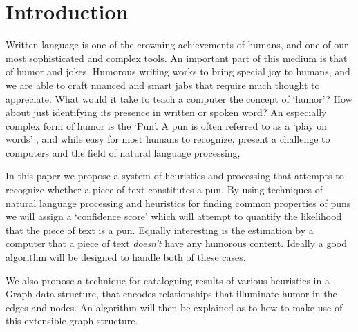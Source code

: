 \section{Introduction}

Written language is one of the crowning achievements of humans, and one of our most sophisticated and complex tools. An important part of this medium is that of humor and jokes. Humorous writing works to bring special joy to humans, and we are able to craft nuanced and smart jabs that require much thought to appreciate. What would it take to teach a computer the concept of `humor'? How about just identifying its presence in written or spoken word? An especially complex form of humor is the `Pun'.  A pun  is often referred to as a `play on words' , and while easy for most humans to recognize, present a challenge to computers and the field of natural language processing,

In this paper we propose a system of heuristics and processing that attempts to recognize whether a piece of text constitutes a pun. By using techniques of natural language processing and heuristics for finding common properties of puns we will assign a `confidence score' which will attempt to quantify the likelihood that the piece of text is a pun. Equally interesting is the estimation by a computer that a piece of text \emph{doesn't} have any humorous content. Ideally a good algorithm will be designed to handle both of these cases. 

We also propose a technique for cataloguing results of various heuristics in a Graph data structure, that encodes relationships that illuminate humor in the edges and nodes. An algorithm will then be explained as to how to make use of this extensible graph structure.
